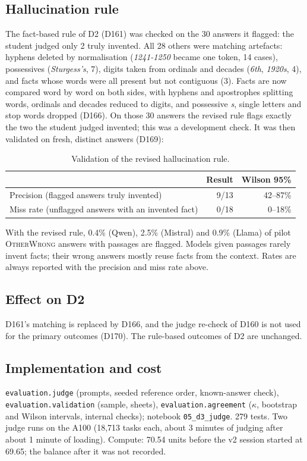 \documentclass[11pt,a4paper]{report}
\begin{document}
\subsection{Hallucination rule}
The fact-based rule of D2 (D161) was checked on the 30 answers it flagged: the
student judged only 2 truly invented. All 28 others were matching artefacts:
hyphens deleted by normalisation (\emph{1241-1250} became one token, 14
cases), possessives (\emph{Sturgess's}, 7), digits taken from ordinals and
decades (\emph{6th}, \emph{1920s}, 4), and facts whose words were all present
but not contiguous (3). Facts are now compared word by word on both sides,
with hyphens and apostrophes splitting words, ordinals and decades reduced to
digits, and possessive \emph{s}, single letters and stop words dropped (D166).
On those 30 answers the revised rule flags exactly the two the student judged
invented; this was a development check. It was then validated on fresh,
distinct answers (D169):

\begin{table}[h]
\centering
\begin{tabular}{lrr}
\hline
 & Result & Wilson 95\% \\
\hline
Precision (flagged answers truly invented) & 9/13 & 42--87\% \\
Miss rate (unflagged answers with an invented fact) & 0/18 & 0--18\% \\
\hline
\end{tabular}
\caption{Validation of the revised hallucination rule.}
\end{table}

With the revised rule, 0.4\% (Qwen), 2.5\% (Mistral) and 0.9\% (Llama) of
pilot \textsc{OtherWrong} answers with passages are flagged. Models given
passages rarely invent facts; their wrong answers mostly reuse facts from the
context. Rates are always reported with the precision and miss rate above.

\subsection{Effect on D2}
D161's matching is replaced by D166, and the judge re-check of D160 is not
used for the primary outcomes (D170). The rule-based outcomes of D2 are
unchanged.

\subsection{Implementation and cost}
\texttt{evaluation.judge} (prompts, seeded reference order, known-answer
check), \texttt{evaluation.validation} (sample, sheets),
\texttt{evaluation.agreement} ($\kappa$, bootstrap and Wilson intervals,
internal checks); notebook \texttt{05\_d3\_judge}. 279 tests. Two judge runs
on the A100 (18{,}713 tasks each, about 3 minutes of judging after about
1 minute of loading). Compute: 70.54 units before the v2 session started at
69.65; the balance after it was not recorded.
\end{document}
